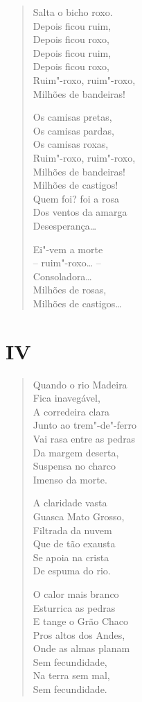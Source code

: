 {\begin{verse}
Salta o bicho roxo.\\
Depois ficou ruim,\\
Depois ficou roxo,\\
Depois ficou ruim,\\
Depois ficou roxo,\\
Ruim"-roxo, ruim"-roxo,\\
Milhões de bandeiras!

Os camisas pretas,\\
Os camisas pardas,\\
Os camisas roxas,\\
Ruim"-roxo, ruim"-roxo,\\
Milhões de bandeiras!\\
Milhões de castigos!\\
Quem foi? foi a rosa\\
Dos ventos da amarga\\
Desesperança\ldots{}

Ei"-vem a morte\\
-- ruim"-roxo\ldots{} --\\
Consoladora\ldots{}\\
Milhões de rosas,\\
Milhões de castigos\ldots{}
\end{verse}

\pagebreak
\section*{IV}

\begin{verse}
Quando o rio Madeira\\
Fica inavegável,\\
A corredeira clara\\
Junto ao trem"-de"-ferro\\
Vai rasa entre as pedras\\
Da margem deserta,\\
Suspensa no charco\\
Imenso da morte.

A claridade vasta\\
Guasca Mato Grosso,\\
Filtrada da nuvem\\
Que de tão exausta\\
Se apoia na crista\\
De espuma do rio.

O calor mais branco\\
Esturrica as pedras\\
E tange o Grão Chaco\\
Pros altos dos Andes,\\
Onde as almas planam\\
Sem fecundidade,\\
Na terra sem mal,\\
Sem fecundidade.
\end{verse}

}
